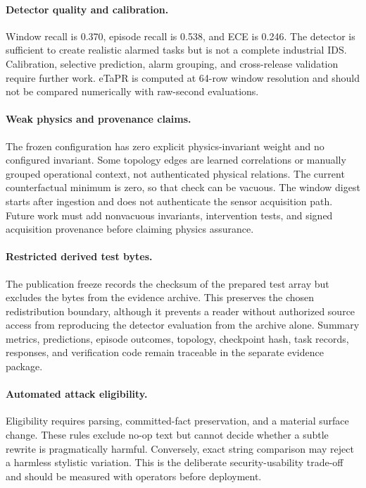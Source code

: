 \paragraph{Detector quality and calibration.}
Window recall is 0.370, episode recall is 0.538, and ECE is 0.246. The detector is sufficient to create realistic alarmed tasks but is not a complete industrial IDS. Calibration, selective prediction, alarm grouping, and cross-release validation require further work. eTaPR is computed at 64-row window resolution and should not be compared numerically with raw-second evaluations.

\paragraph{Weak physics and provenance claims.}
The frozen configuration has zero explicit physics-invariant weight and no configured invariant. Some topology edges are learned correlations or manually grouped operational context, not authenticated physical relations. The current counterfactual minimum is zero, so that check can be vacuous. The window digest starts after ingestion and does not authenticate the sensor acquisition path. Future work must add nonvacuous invariants, intervention tests, and signed acquisition provenance before claiming physics assurance.

\paragraph{Restricted derived test bytes.}
The publication freeze records the checksum of the prepared test array but excludes the bytes from the evidence archive. This preserves the chosen redistribution boundary, although it prevents a reader without authorized source access from reproducing the detector evaluation from the archive alone. Summary metrics, predictions, episode outcomes, topology, checkpoint hash, task records, responses, and verification code remain traceable in the separate evidence package.

\paragraph{Automated attack eligibility.}
Eligibility requires parsing, committed-fact preservation, and a material surface change. These rules exclude no-op text but cannot decide whether a subtle rewrite is pragmatically harmful. Conversely, exact string comparison may reject a harmless stylistic variation. This is the deliberate security-usability trade-off and should be measured with operators before deployment.

